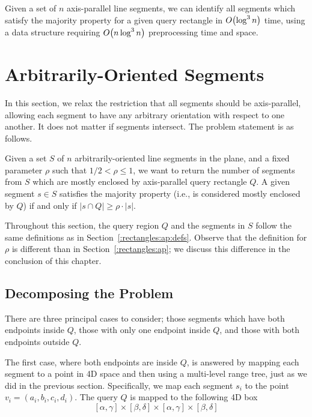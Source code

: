 \begin{theorem}
\label{th:ap}
Given a set of $n$ axis-parallel line segments, we can identify all segments which satisfy the majority property for a given query rectangle in $O\!\left(\log^3{n}\right)$ time, using a data structure requiring $O\!\left(n\log^3{n}\right)$ preprocessing time and space.
\end{theorem}

\section{Arbitrarily-Oriented Segments}
\label{:rectangles:ao}

In this section, we relax the restriction that all segments should be axis-parallel, allowing each segment to have any arbitrary orientation with respect to one another. 
It does not matter if segments intersect. 
The problem statement is as follows.

\begin{problem}
Given a set $S$ of $n$ arbitrarily-oriented line segments in the plane, and a fixed parameter $\rho$ such that $1/2 < \rho \leq 1$, we want to return the number of segments from $S$ which are mostly enclosed by axis-parallel query rectangle $Q$. A given segment $s \in S$ satisfies the majority property (i.e., is considered mostly enclosed by $Q$) if and only if $|s \cap Q| \geq \rho \cdot |s|$.
\end{problem}

Throughout this section, the query region $Q$ and the segments in $S$ follow the same definitions as in Section~\ref{:rectangles:ap:defs}. Observe that the definition for $\rho$ is different than in Section~\ref{:rectangles:ap}; we discuss this difference in the conclusion of this chapter.


\subsection{Decomposing the Problem}
\label{:rectangles:ao:approach}

There are three principal cases to consider; those segments which have both endpoints inside $Q$, those with only one endpoint inside $Q$, and those with both endpoints outside $Q$.  

The first case, where both endpoints are inside $Q$, is answered by mapping each segment to a point in 4D space and then using a multi-level range tree, just as we did in the previous section.  Specifically, we map each segment $s_i$ to the point $v_i = (a_i, b_i, c_i, d_i)$. The query $Q$ is mapped to the following 4D box
\[
[\alpha, \gamma] \times [\beta, \delta] \times [\alpha, \gamma] \times [\beta, \delta]
\]

